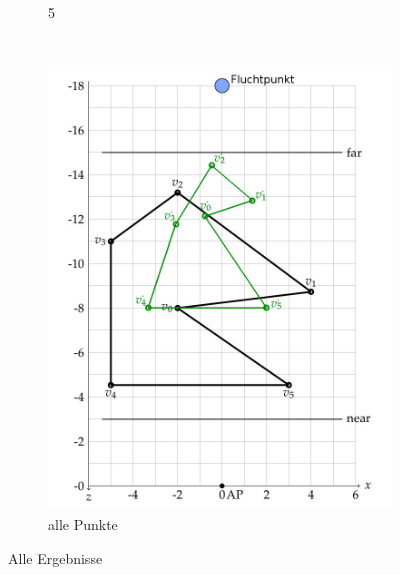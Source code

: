 \documentclass[a4paper,10pt,DIV=14]{article}
\begin{document}
\begin{figure}[H]
\begin{subfigure}{0.3\textwidth}
		\caption{5}
	\end{subfigure}
	~
	\begin{subfigure}{0.3\textwidth}
		\includegraphics[width=\textwidth]{2b_full}
		\caption{alle Punkte}
	\end{subfigure}
	\caption{Alle Ergebnisse}
\end{figure}
\clearpage
\end{document}
